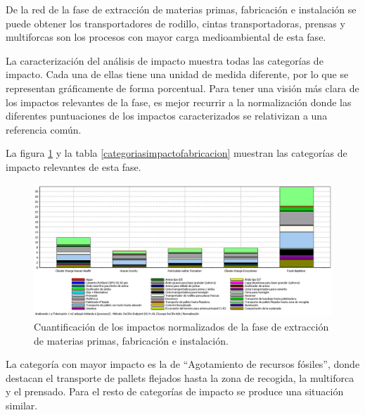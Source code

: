 De la red de la fase de extracción de materias primas, fabricación e instalación se puede obtener los transportadores de rodillo, cintas transportadoras, prensas y multiforcas son los procesos con mayor carga medioambiental de esta fase.

La caracterización del análisis de impacto muestra todas las categorías de impacto. Cada una de ellas tiene una unidad de medida diferente, por lo que se representan gráficamente de forma porcentual. Para tener una visión más clara de los impactos relevantes de la fase, es mejor recurrir a la normalización donde las diferentes puntuaciones de los impactos caracterizados se relativizan a una referencia común.

La figura \ref{fig:fabric_normalizacion} y la tabla \ref{categoriasimpactofabricacion} muestran las categorías de impacto relevantes de esta fase.

\begin{figure}[!htb]
\centering
\includegraphics[width=15cm]{img/fabric_normalizacion.png}
\caption{Cuantificación de los impactos normalizados de la fase de extracción de materias primas, fabricación e instalación.}
\label{fig:fabric_normalizacion}
\end{figure}

La categoría con mayor impacto es la de ``Agotamiento de recursos fósiles'', donde destacan el transporte de pallets flejados hasta la zona de recogida, la multiforca y el prensado. Para el resto de categorías de impacto se produce una situación similar.

